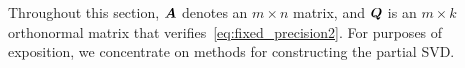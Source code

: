 \documentclass[final]{siamltex}
\newcounter{algorithm}[section]
\begin{document}
%

Throughout this section, $\bm{A}$ denotes an $m\times n$
matrix, and $\bm{Q}$ is an $m\times k$ orthonormal matrix
that verifies~\eqref{eq:fixed_precision2}.  For purposes
of exposition, we concentrate on methods for constructing
the partial SVD.
\end{document}
